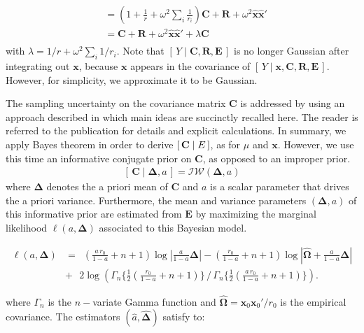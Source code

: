 \documentclass[12pt]{article}
\newcommand{\x}{\boldsymbol{x}}
\newcommand{\Om}{\boldsymbol{\Omega}}
\newcommand{\E}{\mathbf{E}}
\newcommand{\D}{\mathbf{\Delta}}
\newcommand{\Sn}{\widehat{\mathbf{\Omega}}}
\begin{document}
\begin{appendix}[A]
\begin{equation}
\begin{array}{ll}
&=(1+\frac{1}{r}+\omega^2\sum_i\frac{1}{r_i})\mathbf{C}+\mathbf R+\omega^2\widehat{\x}\widehat{\x}'\\
&=\mathbf{C}+\mathbf R+\omega^2\widehat{\x}\widehat{\x}'+\lambda \mathbf{C}\\
\end{array}
\end{equation}
with $\lambda=1/r+\omega^2\sum_i1/r_i$. Note that $\left[\,Y\mid \mathbf{C}, \mathbf{R},\E\,\right]$ is no longer Gaussian after integrating out $\x$, because $\x$ appears in the covariance of $\left[\,Y\mid \x, \mathbf{C}, \mathbf{R},\E\,\right]$. However, for simplicity, we approximate it to be Gaussian. 

The sampling uncertainty on the covariance matrix $\mathbf C$ is addressed by using an approach described in \cite{HN14} which main ideas are succinctly recalled here. The reader is referred to the publication for details and explicit calculations. In summary, we apply Bayes theorem in order to derive $\left[\,\mathbf C\mid \mathbf \E \,\right]$, as for $\mu$ and $\x$. However, we use this time an informative conjugate prior on $\mathbf C$, as opposed to an improper prior.
\begin{equation} 
\label{modelcov1}
\begin{array}{ll}
\left[\,\mathbf C\mid \mathbf \Delta, a\,\right] = \mathcal{IW}(\mathbf \Delta, a)
\end{array}
\end{equation}
where $\mathbf \Delta$ denotes the a priori mean of $\mathbf C$ and $a$ is a scalar parameter that drives the a priori variance.  Furthermore, the mean and variance parameters $(\mathbf \Delta,a)$ of this informative prior are estimated from $\E$ by maximizing the marginal likelihood $\ell(a,\D)$ associated to this Bayesian model. 
\begin{linenomath*}\begin{equation}
\label{ell}
\begin{array}{lll}
\ell(a,\D)&=\,\,\,(\frac{a\,r_0}{1-a}+n+1)\log|\frac{a}{1-a}\mathbf\Delta|-(\frac{r_0}{1-a}+n+1)\log|\Sn+\frac{a}{1-a}\mathbf{\Delta}|\\%
&+\,\,\,\,2\log\left(\Gamma_n\{\frac{1}{2}(\frac{r_0}{1-a}+n+1)\}\,/\,\Gamma_n\{\frac{1}{2}(\frac{a\,r_0}{1-a}+n+1)\}\right).
\end{array}
\end{equation}\end{linenomath*}
where $\Gamma_n$ is the $n-$variate Gamma function and $\widehat{\Om}=\x_0\x_0'/r_0$ is the empirical covariance. The estimators $(\widehat{a},\widehat{\mathbf \Delta})$ satisfy to:

\end{appendix}
\end{document}
